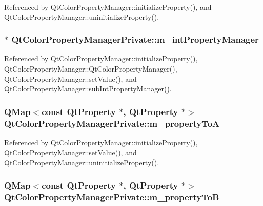 Referenced by Qt\+Color\+Property\+Manager\+::initialize\+Property(), and Qt\+Color\+Property\+Manager\+::uninitialize\+Property().

\subsubsection[{m\+\_\+int\+Property\+Manager}]{$\ast$ Qt\+Color\+Property\+Manager\+Private\+::m\+\_\+int\+Property\+Manager}\label{classQtColorPropertyManagerPrivate_ad98119b87bc3c0c91cc81a07fa40d1d0}


Referenced by Qt\+Color\+Property\+Manager\+::initialize\+Property(), Qt\+Color\+Property\+Manager\+::\+Qt\+Color\+Property\+Manager(), Qt\+Color\+Property\+Manager\+::set\+Value(), and Qt\+Color\+Property\+Manager\+::sub\+Int\+Property\+Manager().

\subsubsection[{m\+\_\+property\+ToA}]{\setlength{\rightskip}{0pt plus 5cm}Q\+Map$<$const {\bf Qt\+Property} $\ast$, {\bf Qt\+Property} $\ast$$>$ Qt\+Color\+Property\+Manager\+Private\+::m\+\_\+property\+ToA}\label{classQtColorPropertyManagerPrivate_a237bd65632ade096661be790be3d2451}


Referenced by Qt\+Color\+Property\+Manager\+::initialize\+Property(), Qt\+Color\+Property\+Manager\+::set\+Value(), and Qt\+Color\+Property\+Manager\+::uninitialize\+Property().

\subsubsection[{m\+\_\+property\+ToB}]{\setlength{\rightskip}{0pt plus 5cm}Q\+Map$<$const {\bf Qt\+Property} $\ast$, {\bf Qt\+Property} $\ast$$>$ Qt\+Color\+Property\+Manager\+Private\+::m\+\_\+property\+ToB}\label{classQtColorPropertyManagerPrivate_a859a1c0d4fec00924362c8d4f908305d}


